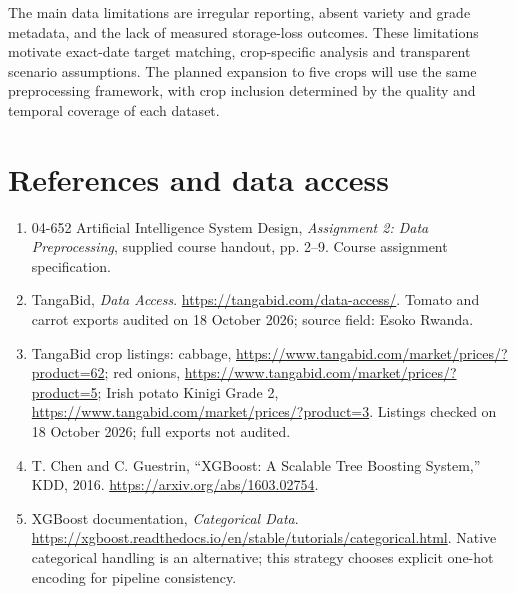 \documentclass[11pt,a4paper]{article}
\begin{document}
The main data limitations are irregular reporting, absent variety and grade metadata, and the lack of measured storage-loss outcomes. These limitations motivate exact-date target matching, crop-specific analysis and transparent scenario assumptions. The planned expansion to five crops will use the same preprocessing framework, with crop inclusion determined by the quality and temporal coverage of each dataset.

\section*{References and data access}
\begin{enumerate}[leftmargin=*,itemsep=7pt]
\item 04-652 Artificial Intelligence System Design, \emph{Assignment 2: Data Preprocessing}, supplied course handout, pp. 2--9. Course assignment specification.
\item TangaBid, \emph{Data Access}. \url{https://tangabid.com/data-access/}. Tomato and carrot exports audited on 18 October 2026; source field: Esoko Rwanda.
\item TangaBid crop listings: cabbage, \url{https://www.tangabid.com/market/prices/?product=62}; red onions, \url{https://www.tangabid.com/market/prices/?product=5}; Irish potato Kinigi Grade 2, \url{https://www.tangabid.com/market/prices/?product=3}. Listings checked on 18 October 2026; full exports not audited.
\item T. Chen and C. Guestrin, ``XGBoost: A Scalable Tree Boosting System,'' KDD, 2016. \url{https://arxiv.org/abs/1603.02754}.
\item XGBoost documentation, \emph{Categorical Data}. \url{https://xgboost.readthedocs.io/en/stable/tutorials/categorical.html}. Native categorical handling is an alternative; this strategy chooses explicit one-hot encoding for pipeline consistency.
\end{enumerate}
\end{document}
